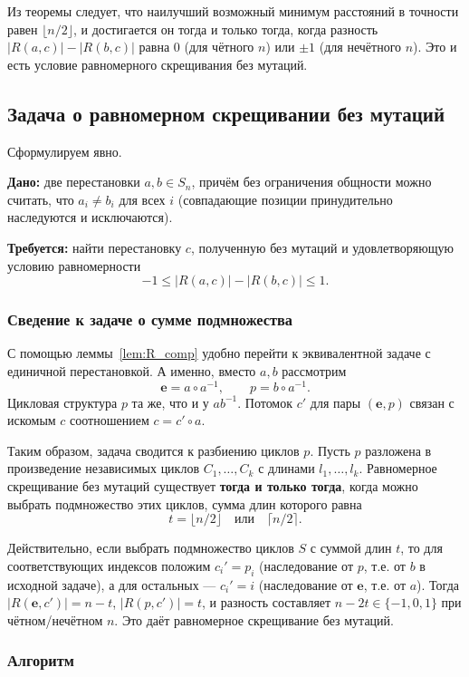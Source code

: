 \documentclass[732]{studrep}
\newcommand{\id}{\mathbf{e}}
\theoremstyle{nonumberplain}
\begin{document}
Из теоремы следует, что наилучший возможный минимум расстояний в точности равен $\lfloor n/2\rfloor$, и достигается он тогда и только тогда, когда разность $|R(a,c)|-|R(b,c)|$ равна $0$ (для чётного $n$) или $\pm1$ (для нечётного $n$). Это и есть условие равномерного скрещивания без мутаций.

\subsection{Задача о равномерном скрещивании без мутаций}
\label{sec:uniform_crossover}

Сформулируем явно.

\textbf{Дано:} две перестановки $a,b\in S_n$, причём без ограничения общности можно считать, что $a_i\neq b_i$ для всех $i$ (совпадающие позиции принудительно наследуются и исключаются).

\textbf{Требуется:} найти перестановку $c$, полученную без мутаций и удовлетворяющую условию равномерности
\[
-1 \le |R(a,c)| - |R(b,c)| \le 1.
\]

\subsubsection*{Сведение к задаче о сумме подмножества}

С помощью леммы~\ref{lem:R_comp} удобно перейти к эквивалентной задаче с единичной перестановкой. А именно, вместо $a,b$ рассмотрим
\[
\id = a\circ a^{-1},\qquad p = b\circ a^{-1}.
\]
Цикловая структура $p$ та же, что и у $ab^{-1}$. Потомок $c'$ для пары $(\id, p)$ связан с искомым $c$ соотношением $c = c'\circ a$.

Таким образом, задача сводится к разбиению циклов $p$. Пусть $p$ разложена в произведение независимых циклов $C_1,\dots,C_k$ с длинами $l_1,\dots,l_k$. Равномерное скрещивание без мутаций существует \textbf{тогда и только тогда}, когда можно выбрать подмножество этих циклов, сумма длин которого равна
\[
t = \lfloor n/2\rfloor \quad\text{или}\quad \lceil n/2\rceil.
\]

Действительно, если выбрать подмножество циклов $S$ с суммой длин $t$, то для соответствующих индексов положим $c_i' = p_i$ (наследование от $p$, т.е. от $b$ в исходной задаче), а для остальных — $c_i' = i$ (наследование от $\id$, т.е. от $a$). Тогда $|R(\id,c')| = n - t$, $|R(p,c')| = t$, и разность составляет $n-2t \in \{-1,0,1\}$ при чётном/нечётном $n$. Это даёт равномерное скрещивание без мутаций.

\subsubsection*{Алгоритм}
\end{document}
